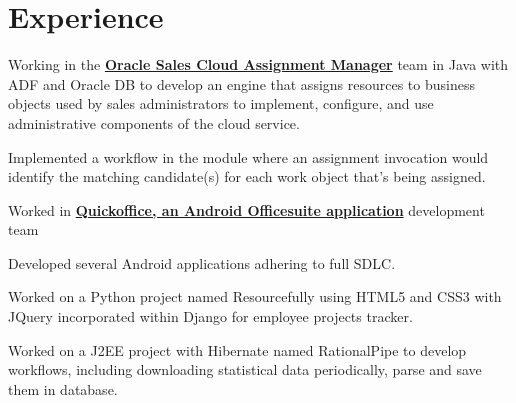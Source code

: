 \documentclass[a4paper]{srika-resume} %
\begin{document}
\begin{minipage}[t]{0.64\textwidth} %


\section{Experience}


\vspace{\topsep} %
\begin{tightitemize}
\item Working in the \textbf{\href{https://docs.oracle.com/cloud/latest/salescs_gs/OASAL/OASAL1439686.htm\#OASAL1439686}{Oracle Sales Cloud Assignment Manager}} team in Java with ADF and Oracle DB to develop an engine that assigns resources to business objects used by sales administrators to implement, configure, and use administrative components of the cloud service.
\item Implemented a workflow in the module where an assignment invocation would identify the matching candidate(s) for each work object that’s being assigned.
\end{tightitemize}

\sectionspace %



\begin{tightitemize}
\item Worked in \textbf{\href{https://en.wikipedia.org/wiki/Quickoffice}{Quickoffice, an Android Officesuite application}} development team
\item Developed several Android applications adhering to full SDLC.
\item Worked on a Python project named Resourcefully using HTML5 and CSS3 with JQuery incorporated within Django for employee projects tracker.
\item Worked on a J2EE project with Hibernate named RationalPipe to develop workflows, including downloading statistical data periodically, parse and save them in database. 
\end{tightitemize}


\end{minipage}
\end{document}
